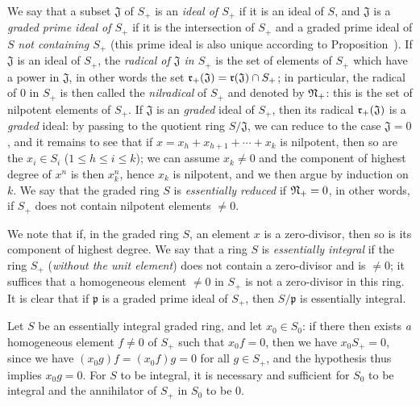 \begin{env}[2.1.10]
\label{II.2.1.10}
We say that a subset $\mathfrak{J}$ of $S_+$ is an \emph{ideal of $S_+$} if it is an ideal of $S$, and $\mathfrak{J}$ is a \emph{graded prime ideal of $S_+$} if it is the intersection of $S_+$ and a graded prime ideal of $S$ \emph{not containing $S_+$} (this prime ideal is also unique according to Proposition~).
If $\mathfrak{J}$ is an ideal of $S_+$, the \emph{radical of $\mathfrak{J}$ in $S_+$} is the set of elements of $S_+$ which have a power in $\mathfrak{J}$, in other words the set $\mathfrak{r}_+(\mathfrak{J})=\mathfrak{r}(\mathfrak{J})\cap S_+$;
in particular, the radical of $0$ in $S_+$ is then called the \emph{nilradical} of $S_+$ and denoted by $\mathfrak{N}_+$: this is the set of nilpotent elements of $S_+$.
If $\mathfrak{J}$ is an \emph{graded} ideal of $S_+$, then its radical $\mathfrak{r}_+(\mathfrak{J})$ is a \emph{graded} ideal: by passing to the quotient ring $S/\mathfrak{J}$, we can reduce to the case $\mathfrak{J}=0$, and it remains to see that if $x=x_h+x_{h+1}+\cdots+x_k$ is nilpotent, then so are the $x_i\in S_i$ ($1\leq h\leq i\leq k$);
we can assume $x_k\neq 0$ and the component of highest degree of $x^n$ is then $x_k^n$, hence $x_k$ is nilpotent, and we then argue by induction on $k$.
We say that the graded ring $S$ is \emph{essentially reduced} if $\mathfrak{N}_+=0$, in other words, if $S_+$ does not contain nilpotent elements $\neq 0$.
\end{env}

\begin{env}[2.1.11]
\label{II.2.1.11}
We note that if, in the graded ring $S$, an element $x$ is a zero-divisor, then so is its component of highest degree.
We say that a ring $S$ is \emph{essentially integral} if the ring $S_+$ (\emph{without the unit element}) does not contain a zero-divisor and is $\neq 0$;
it suffices that a homogeneous element $\neq 0$ in $S_+$ is not a zero-divisor in this ring.
It is clear that if $\mathfrak{p}$ is a graded prime ideal of $S_+$, then $S/\mathfrak{p}$ is essentially integral.

Let $S$ be an essentially integral graded ring, and let $x_0\in S_0$:
if there then exists \emph{a} homogeneous element $f\neq 0$ of $S_+$ such that $x_0 f=0$, then we have $x_0 S_+=0$, since we have $(x_0 g)f=(x_0 f)g=0$ for all $g\in S_+$, and the hypothesis thus implies $x_0 g=0$.
For $S$ to be integral, it is necessary and sufficient for $S_0$ to be integral and the annihilator of $S_+$ in $S_0$ to be $0$.
\end{env}


